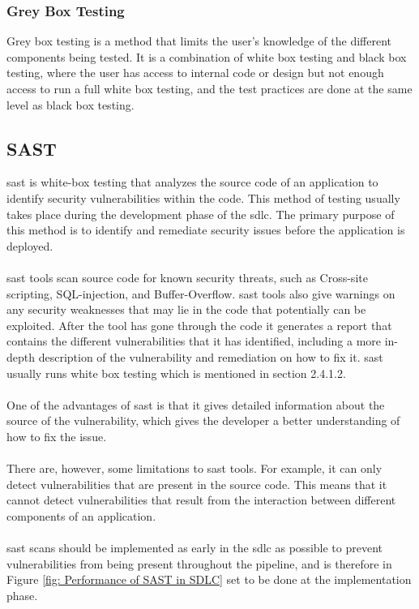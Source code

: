 \subsubsection{Grey Box Testing}
Grey box testing is a method that limits the user's knowledge of the different components being tested. It is a combination of white box testing and black box testing, where the user has access to internal code or design but not enough access to run a full white box testing, and the test practices are done at the same level as black box testing. \cite{GreyBox}


\subsection{SAST}
\acrlong{sast} is white-box testing that analyzes the source code of an application to identify security vulnerabilities within the code. This method of testing usually takes place during the development phase of the \acrlong{sdlc}. The primary purpose of this method is to identify and remediate security issues before the application is deployed. \cite{sast}
\\~\\
\acrshort{sast} tools scan source code for known security threats, such as \gls{Cross-site scripting}, \gls{SQL-injection}, and \gls{Buffer-Overflow}. \acrshort{sast} tools also give warnings on any security weaknesses that may lie in the code that potentially can be exploited. After the tool has gone through the code it generates a report that contains the different vulnerabilities that it has identified, including a more in-depth description of the vulnerability and remediation on how to fix it. \acrshort{sast} usually runs white box testing  which is mentioned in section 2.4.1.2. 
\\~\\
One of the advantages of \acrshort{sast} is that it gives detailed information about the source of the vulnerability, which gives the developer a better understanding of how to fix the issue. 
\\~\\
There are, however, some limitations to \acrshort{sast} tools. For example, it can only detect vulnerabilities that are present in the source code. This means that it cannot detect vulnerabilities that result from the interaction between different components of an application.
\\~\\
\acrshort{sast} scans should be implemented as early in the \acrshort{sdlc} as possible to prevent vulnerabilities from being present throughout the pipeline, and is therefore in Figure \ref{fig: Performance of SAST in SDLC} set to be done at the implementation phase.  
